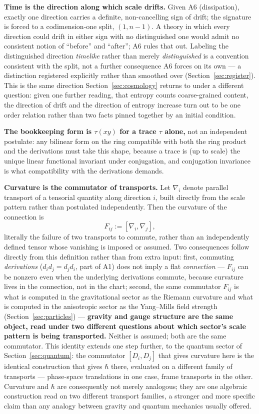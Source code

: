 \documentclass[pdflatex,sn-mathphys-num]{sn-jnl}
\theoremstyle{thmstyleone}
\theoremstyle{thmstylethree}
\theoremstyle{thmstyletwo}
\begin{document}
\textbf{Time is the direction along which scale drifts.} Given A6
(dissipation), exactly one direction carries a definite, non-cancelling
sign of drift; the signature is forced to a codimension-one split,
$(1,n-1)$. A theory in which every direction could drift in either sign
with no distinguished one would admit no consistent notion of ``before''
and ``after''; A6 rules that out. Labeling the distinguished direction
\emph{timelike} rather than merely \emph{distinguished} is a convention
consistent with the split, not a further consequence A6 forces on its
own — a distinction registered explicitly rather than smoothed over
(Section~\ref{sec:register}). This is the same direction Section~\ref{sec:cosmology}
returns to under a different question: given one further reading, that
entropy counts coarse-grained content, the direction of drift and the
direction of entropy increase turn out to be one order relation rather
than two facts pinned together by an initial condition.

\textbf{The bookkeeping form is $\tau(xy)$ for a trace $\tau$ alone,} not
an independent postulate: any bilinear form on the ring compatible with
both the ring product and the derivations must take this shape, because a
trace is (up to scale) the unique linear functional invariant under
conjugation, and conjugation invariance is what compatibility with the
derivations demands.

\textbf{Curvature is the commutator of transports.} Let $\nabla_i$ denote
parallel transport of a tensorial quantity along direction $i$, built
directly from the scale pattern rather than postulated independently.
Then the curvature of the connection is
\begin{equation}
F_{ij} := [\nabla_i, \nabla_j],
\end{equation}
literally the failure of two transports to commute, rather than an
independently defined tensor whose vanishing is imposed or assumed. Two
consequences follow directly from this definition rather than from extra
input: first, commuting \emph{derivations} ($d_id_j = d_jd_i$, part of
A1) does not imply a flat \emph{connection} — $F_{ij}$ can be nonzero
even when the underlying derivations commute, because curvature lives in
the connection, not in the chart; second, the same commutator $F_{ij}$ is
what is computed in the gravitational sector as the Riemann curvature and
what is computed in the anisotropic sector as the Yang–Mills field
strength (Section~\ref{sec:particles}) — \textbf{gravity and gauge
structure are the same object, read under two different questions about
which sector's scale pattern is being transported.} Neither is assumed;
both are the same commutator. This identity extends one step further,
to the quantum sector of Section~\ref{sec:quantum}: the commutator
$[D_i,D_j]$ that gives curvature here is the identical construction
that gives $\hbar$ there, evaluated on a different family of
transports — phase-space translations in one case, frame transports in
the other. Curvature and $\hbar$ are consequently not merely analogous;
they are one algebraic construction read on two different transport
families, a stronger and more specific claim than any analogy between
gravity and quantum mechanics usually offered.
\end{document}
